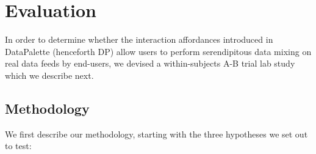 \documentclass{sigchi}
\begin{document}



\section{Evaluation}

In order to determine whether the interaction affordances introduced in DataPalette (henceforth DP) allow users to perform serendipitous data mixing on real data feeds by end-users, we devised a within-subjects A-B trial lab study which we describe next.

\subsection{Methodology}

We first describe our methodology, starting with the three hypotheses we set out to test:
\end{document}
